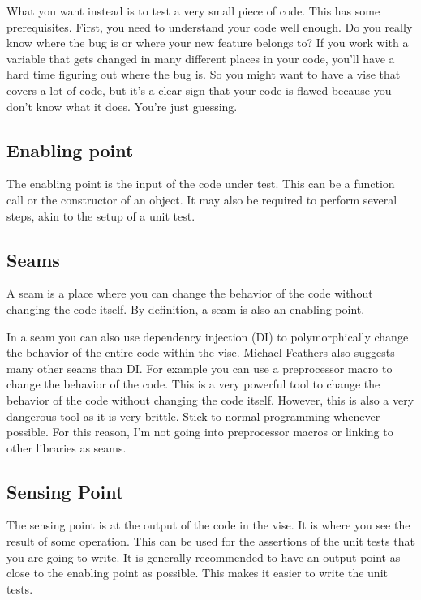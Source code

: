 What you want instead is to test a very small piece of code. This has some prerequisites. First, you need to understand your code well enough. Do you really know where the bug is or where your new feature belongs to? If you work with a variable that gets changed in many different places in your code, you'll have a hard time figuring out where the bug is. So you might want to have a vise that covers a lot of code, but it's a clear sign that your code is flawed because you don't know what it does. You're just guessing.


\subsection{Enabling point}

The enabling point is the input of the code under test. This can be a function call or the constructor of an object. It may also be required to perform several steps, akin to the setup of a unit test. 

\subsection{Seams}

A seam is a place where you can change the behavior of the code without changing the code itself. By definition, a seam is also an enabling point.

In a seam you can also use dependency injection (DI) to polymorphically change the behavior of the entire code within the vise. Michael Feathers also suggests many other seams than DI. For example you can use a preprocessor macro to change the behavior of the code. This is a very powerful tool to change the behavior of the code without changing the code itself. However, this is also a very dangerous tool as it is very brittle. Stick to normal programming whenever possible. For this reason, I'm not going into preprocessor macros or linking to other libraries as seams.

\subsection{Sensing Point}

The sensing point is at the output of the code in the vise. It is where you see the result of some operation. This can be used for the assertions of the unit tests that you are going to write. It is generally recommended to have an output point as close to the enabling point as possible. This makes it easier to write the unit tests.

